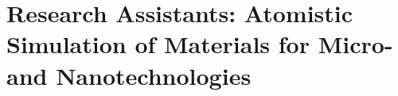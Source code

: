 \documentclass{mycv}
\begin{document}

\cvheader
\section{\ClTilte Research Assistants: Atomistic Simulation of Materials for Micro- and Nanotechnologies}

\end{document}
